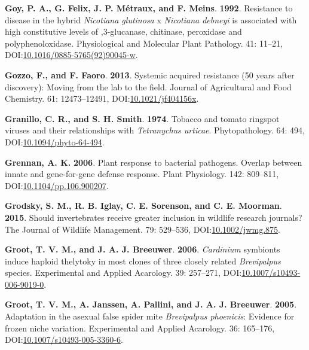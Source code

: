 \documentclass[12pt,final,CPage]{ufthesis}
\newlength{\cslhangindent}
\newenvironment{CSLReferences}[2] %
{%
	\setlength{\parindent}{0pt}
	\ifodd #1 \everypar{\setlength{\hangindent}{\cslhangindent}}\ignorespaces\fi
	\ifnum #2 > 0
	\setlength{\parskip}{#2\baselineskip}
	\fi
}%
{}
\begin{document}
{\begin{CSLReferences}{1}{0}
  \leavevmode{}%
  \textbf{Goy, P. A., G. Felix, J. P. Métraux, and F. Meins}. \textbf{1992}. Resistance to disease in the hybrid {\emph{Nicotiana glutinosa}} x {\emph{Nicotiana debneyi}} is associated with high constitutive levels of ,3-glucanase, chitinase, peroxidase and polyphenoloxidase. Physiological and Molecular Plant Pathology. 41: 11--21, DOI:\href{https://doi.org/10.1016/0885-5765(92)90045-w}{10.1016/0885-5765(92)90045-w}.

  \leavevmode{}%
  \textbf{Gozzo, F., and F. Faoro}. \textbf{2013}. Systemic acquired resistance (50 years after discovery): Moving from the lab to the field. Journal of Agricultural and Food Chemistry. 61: 12473--12491, DOI:\href{https://doi.org/10.1021/jf404156x}{10.1021/jf404156x}.

  \leavevmode{}%
  \textbf{Granillo, C. R., and S. H. Smith}. \textbf{1974}. Tobacco and tomato ringspot viruses and their relationships with {\emph{Tetranychus urticae}}. Phytopathology. 64: 494, DOI:\href{https://doi.org/10.1094/phyto-64-494}{10.1094/phyto-64-494}.

  \leavevmode{}%
  \textbf{Grennan, A. K.} \textbf{2006}. Plant response to bacterial pathogens. Overlap between innate and gene-for-gene defense response. Plant Physiology. 142: 809--811, DOI:\href{https://doi.org/10.1104/pp.106.900207}{10.1104/pp.106.900207}.

  \leavevmode{}%
  \textbf{Grodsky, S. M., R. B. Iglay, C. E. Sorenson, and C. E. Moorman}. \textbf{2015}. Should invertebrates receive greater inclusion in wildlife research journals? The Journal of Wildlife Management. 79: 529--536, DOI:\href{https://doi.org/10.1002/jwmg.875}{10.1002/jwmg.875}.

  \leavevmode{}%
  \textbf{Groot, T. V. M., and J. A. J. Breeuwer}. \textbf{2006}. \emph{Cardinium} symbionts induce haploid thelytoky in most clones of three closely related {\emph{Brevipalpus}} species. Experimental and Applied Acarology. 39: 257--271, DOI:\href{https://doi.org/10.1007/s10493-006-9019-0}{10.1007/s10493-006-9019-0}.

  \leavevmode{}%
  \textbf{Groot, T. V. M., A. Janssen, A. Pallini, and J. A. J. Breeuwer}. \textbf{2005}. Adaptation in the asexual false spider mite {\emph{Brevipalpus phoenicis}}: Evidence for frozen niche variation. Experimental and Applied Acarology. 36: 165--176, DOI:\href{https://doi.org/10.1007/s10493-005-3360-6}{10.1007/s10493-005-3360-6}.


\end{CSLReferences}}
\end{document}
